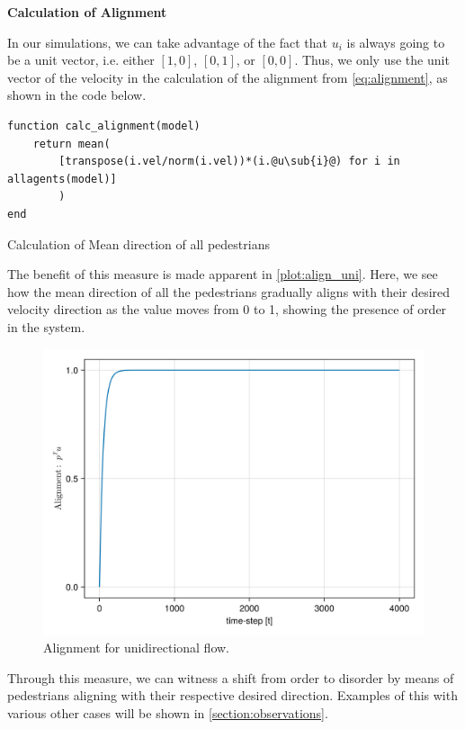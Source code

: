 \textbf{Calculation of Alignment}

In our simulations, we can take advantage of the fact that $u_i$ is always going to be a unit vector, i.e. either $[1,0]$, $[0,1]$, or $[0,0]$. Thus, we only use the unit vector of the velocity in the calculation of the alignment from \autoref{eq:alignment}, as shown in the code below.

\begin{listing}[H]
\begin{verbatim}    
function calc_alignment(model)
    return mean(
        [transpose(i.vel/norm(i.vel))*(i.@u\sub{i}@) for i in allagents(model)]
        )
end
\end{verbatim}
\caption{Calculation of Mean direction of all pedestrians}
\label{code:calc_alignment}
\end{listing}

The benefit of this measure is made apparent in \autoref{plot:align_uni}. Here, we see how the mean direction of all the pedestrians gradually aligns with their desired velocity direction as the value moves from 0 to 1, showing the presence of order in the system.
\begin{figure}[H]
    \centering
    \includegraphics[width=0.49\linewidth]{figures/ch4_uniflow/straight_uni.png}
    \caption{Alignment for unidirectional flow.}
    \label{plot:align_uni}
\end{figure}

Through this measure, we can witness a shift from order to disorder by means of pedestrians aligning with their respective desired direction. Examples of this with various other cases will be shown in \autoref{section:observations}.
